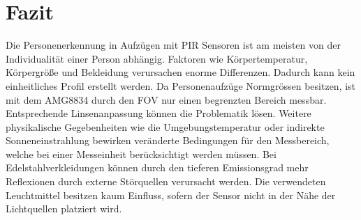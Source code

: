 \section{Fazit}

Die Personenerkennung in Aufzügen mit \ac{PIR} Sensoren ist am meisten von der Individualität einer Person abhängig. Faktoren wie Körpertemperatur, Körpergröße und Bekleidung verursachen enorme Differenzen. Dadurch kann kein einheitliches Profil erstellt werden. Da Personenaufzüge Normgrössen besitzen, ist mit dem AMG8834 durch den \ac{FOV} nur einen begrenzten Bereich messbar. Entsprechende Linsenanpassung können die Problematik lösen. Weitere physikalische Gegebenheiten wie die Umgebungstemperatur oder indirekte Sonneneinstrahlung bewirken veränderte Bedingungen für den Messbereich, welche bei einer Messeinheit berücksichtigt werden müssen. Bei Edelstahlverkleidungen können durch den tieferen Emissionsgrad mehr Reflexionen durch externe Störquellen verursacht werden. Die verwendeten Leuchtmittel besitzen kaum Einfluss, sofern der Sensor nicht in der Nähe der Lichtquellen platziert wird.     

